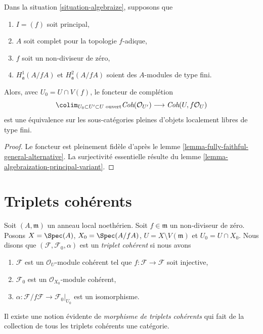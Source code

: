 \begin{lemma}
\label{lemma-equivalence}
Dans la situation \ref{situation-algebraize}, supposons que
\begin{enumerate}
\item $I = (f)$ soit principal,
\item $A$ soit complet pour la topologie $f$-adique,
\item $f$ soit un non-diviseur de zéro,
\item $H^1_\mathfrak a(A/fA)$ et $H^2_\mathfrak a(A/fA)$
soient des $A$-modules de type fini.
\end{enumerate}
Alors, avec $U_0 = U \cap V(f)$, le foncteur de complétion
$$
\colim_{U_0 \subset U' \subset U\text{ ouvert}}
\textit{Coh}(\mathcal{O}_{U'})
\longrightarrow
\textit{Coh}(U, f\mathcal{O}_U)
$$
est une équivalence sur les sous-catégories pleines d'objets localement libres de type fini.
\end{lemma}

\begin{proof}
Le foncteur est pleinement fidèle d'après le
lemme \ref{lemma-fully-faithful-general-alternative}.
La surjectivité essentielle résulte du
lemme \ref{lemma-algebraization-principal-variant}.
\end{proof}








\section{Triplets cohérents}
\label{section-coherent-triples}

\noindent
Soit $(A, \mathfrak m)$ un anneau local noethérien.
Soit $f \in \mathfrak m$ un non-diviseur de zéro. Posons
$X = \Spec(A)$, $X_0 = \Spec(A/fA)$, $U = X \setminus V(\mathfrak m)$ et
$U_0 = U \cap X_0$.
Nous disons que $(\mathcal{F}, \mathcal{F}_0, \alpha)$ est un {\it triplet cohérent}
si nous avons
\begin{enumerate}
\item $\mathcal{F}$ est un $\mathcal{O}_U$-module cohérent tel que
$f : \mathcal{F} \to \mathcal{F}$ soit injective,
\item $\mathcal{F}_0$ est un $\mathcal{O}_{X_0}$-module cohérent,
\item $\alpha : \mathcal{F}/f\mathcal{F} \to \mathcal{F}_0|_{U_0}$
est un isomorphisme.
\end{enumerate}
Il existe une notion évidente de {\it morphisme de triplets cohérents}
qui fait de la collection de tous les triplets cohérents une catégorie.

